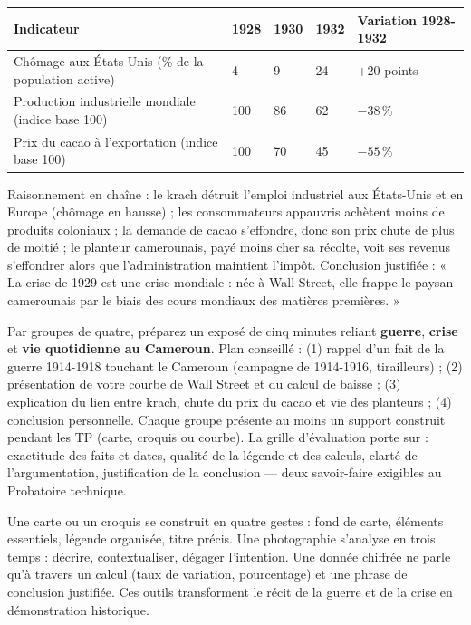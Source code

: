 \documentclass[11pt]{article}
\newcommand{\cle}[1]{{\popxbold\color{popdark}#1}}
\newcounter{popsec}
\newcounter{popsub}
\newcommand{\courssub}[1]{%
  \stepcounter{popsub}%
  \par\vspace{9pt}\noindent{\popxbold\fontsize{11.5}{13}\selectfont\color{popink}{\color{poporange}\thepopsec.\thepopsub}\hspace{6pt}#1}\par\nopagebreak\vspace{4pt}
}
\begin{document}
\begin{center}
\begin{tabularx}{\linewidth}{|l|X|X|X|X|}\hline
\rowcolor{popblueL} \textbf{Indicateur} & 1928 & 1930 & 1932 & Variation 1928-1932 \\ \hline
Chômage aux États-Unis (\% de la population active) & 4 & 9 & 24 & $+20$ points \\ \hline
Production industrielle mondiale (indice base 100) & 100 & 86 & 62 & $-38\,\%$ \\ \hline
Prix du cacao à l'exportation (indice base 100) & 100 & 70 & 45 & $-55\,\%$ \\ \hline
\end{tabularx}
\end{center}

\begin{exemplebox}
Raisonnement en chaîne : le krach détruit l'emploi industriel aux États-Unis et en Europe (chômage en hausse) ; les consommateurs appauvris achètent moins de produits coloniaux ; la demande de cacao s'effondre, donc son prix chute de plus de moitié ; le planteur camerounais, payé moins cher sa récolte, voit ses revenus s'effondrer alors que l'administration maintient l'impôt. Conclusion justifiée : « La crise de 1929 est une crise \cle{mondiale} : née à Wall Street, elle frappe le paysan camerounais par le biais des cours mondiaux des matières premières. »
\end{exemplebox}

\courssub{Restitution : exposé collectif}

Par groupes de quatre, préparez un exposé de cinq minutes reliant \textbf{guerre}, \textbf{crise} et \textbf{vie quotidienne au Cameroun}. Plan conseillé : (1) rappel d'un fait de la guerre 1914-1918 touchant le Cameroun (campagne de 1914-1916, tirailleurs) ; (2) présentation de votre courbe de Wall Street et du calcul de baisse ; (3) explication du lien entre krach, chute du prix du cacao et vie des planteurs ; (4) conclusion personnelle. Chaque groupe présente au moins un support construit pendant les TP (carte, croquis ou courbe). La grille d'évaluation porte sur : exactitude des faits et dates, qualité de la légende et des calculs, clarté de l'argumentation, justification de la conclusion — deux savoir-faire exigibles au Probatoire technique.

\begin{aretenir}
Une carte ou un croquis se construit en quatre gestes : fond de carte, éléments essentiels, légende organisée, titre précis. Une photographie s'analyse en trois temps : décrire, contextualiser, dégager l'intention. Une donnée chiffrée ne parle qu'à travers un calcul (taux de variation, pourcentage) et une phrase de conclusion justifiée. Ces outils transforment le récit de la guerre et de la crise en démonstration historique.
\end{aretenir}
\end{document}
